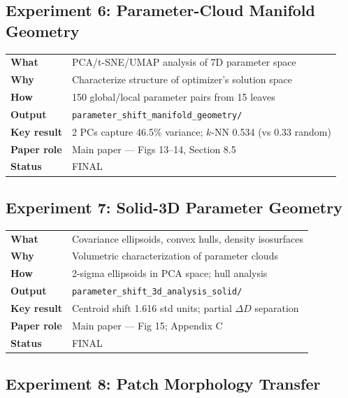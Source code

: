 \documentclass[11pt,a4paper]{article}
\newcommand{\filepath}[1]{\texttt{\small #1}}
\begin{document}
\subsection{Experiment 6: Parameter-Cloud Manifold Geometry}

\begin{tabular}{ll}
\toprule
\textbf{What} & PCA/t-SNE/UMAP analysis of 7D parameter space \\
\textbf{Why} & Characterize structure of optimizer's solution space \\
\textbf{How} & 150 global/local parameter pairs from 15 leaves \\
\textbf{Output} & \filepath{parameter\_shift\_manifold\_geometry/} \\
\textbf{Key result} & 2 PCs capture 46.5\% variance; $k$-NN 0.534 (vs 0.33 random) \\
\textbf{Paper role} & Main paper --- Figs 13--14, Section 8.5 \\
\textbf{Status} & FINAL \\
\bottomrule
\end{tabular}

\subsection{Experiment 7: Solid-3D Parameter Geometry}

\begin{tabular}{ll}
\toprule
\textbf{What} & Covariance ellipsoids, convex hulls, density isosurfaces \\
\textbf{Why} & Volumetric characterization of parameter clouds \\
\textbf{How} & 2-sigma ellipsoids in PCA space; hull analysis \\
\textbf{Output} & \filepath{parameter\_shift\_3d\_analysis\_solid/} \\
\textbf{Key result} & Centroid shift 1.616 std units; partial $\Delta D$ separation \\
\textbf{Paper role} & Main paper --- Fig 15; Appendix C \\
\textbf{Status} & FINAL \\
\bottomrule
\end{tabular}

\subsection{Experiment 8: Patch Morphology Transfer}
\end{document}

